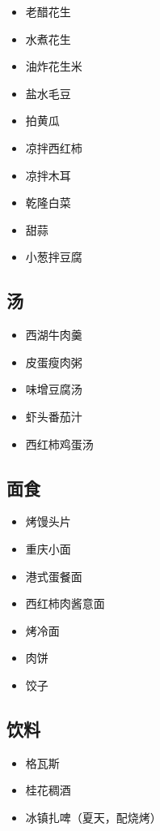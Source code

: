 \documentclass[
  letterpaper,
  DIV=11,
  numbers=noendperiod]{scrreprt}
\providecommand{\tightlist}{%
  \setlength{\itemsep}{0pt}\setlength{\parskip}{0pt}}\usepackage{longtable,booktabs,array}
\begin{document}
\begin{itemize}
\tightlist
\item
  老醋花生
\item
  水煮花生
\item
  油炸花生米
\item
  盐水毛豆
\item
  拍黄瓜
\item
  凉拌西红柿
\item
  凉拌木耳
\item
  乾隆白菜
\item
  甜蒜
\item
  小葱拌豆腐
\end{itemize}

\subsection{汤}\label{ux6c64}

\begin{itemize}
\tightlist
\item
  西湖牛肉羹
\item
  皮蛋瘦肉粥
\item
  味增豆腐汤
\item
  虾头番茄汁
\item
  西红柿鸡蛋汤
\end{itemize}

\subsection{面食}\label{ux9762ux98df}

\begin{itemize}
\tightlist
\item
  烤馒头片
\item
  重庆小面
\item
  港式蛋餐面
\item
  西红柿肉酱意面
\item
  烤冷面
\item
  肉饼
\item
  饺子
\end{itemize}

\subsection{饮料}\label{ux996eux6599}

\begin{itemize}
\tightlist
\item
  格瓦斯
\item
  桂花稠酒
\item
  冰镇扎啤（夏天，配烧烤）
\end{itemize}
\end{document}

